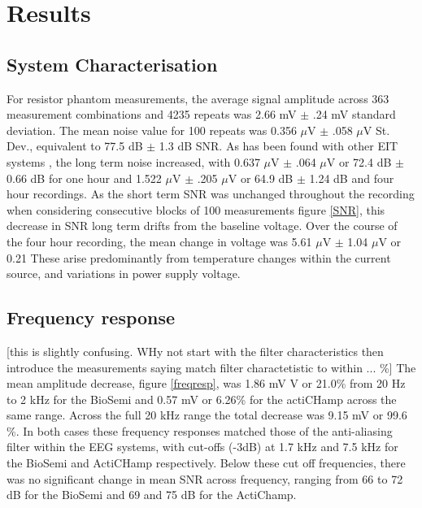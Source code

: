 \section{Results}
\subsection{System Characterisation}
For resistor phantom measurements, the average signal amplitude across 363 measurement combinations and 4235 repeats was 2.66 mV $\pm$ .24 mV standard deviation. The mean noise value for 100 repeats was 0.356 $\mu$V $\pm$ .058 $\mu$V St. Dev., equivalent to 77.5 dB $\pm$ 1.3 dB SNR. As has been found with other EIT systems \cite{oh2007multi}, the long term noise increased, with 0.637 $\mu$V $\pm$ .064 $\mu$V or 72.4 dB $\pm$ 0.66 dB for one hour and 1.522 $\mu$V $\pm$ .205 $\mu$V or 64.9 dB $\pm$ 1.24 dB and four hour recordings. As the short term SNR was unchanged throughout the recording when considering consecutive blocks of 100 measurements figure \ref{SNR}, this decrease in SNR 
long term drifts from the baseline voltage. Over the course of the four hour recording, the mean change in voltage was 5.61 $\mu$V $\pm$ 1.04 $\mu$V or 0.21 %
These arise predominantly from temperature changes within the current source, and variations in power supply voltage.

\subsection{Frequency response}
[this is slightly confusing. WHy not start with the filter characteristics then introduce the measurements saying match filter charactetistic to within ... \%] The mean amplitude decrease, figure \ref{freqresp}, was 1.86 mV V or 21.0\%  from 20 Hz to 2 kHz for the BioSemi and 0.57 mV or 6.26\% for the actiCHamp across the same range. Across the full 20 kHz range the total decrease was 9.15 mV or  99.6 \%.  In both cases these frequency responses matched those of the anti-aliasing filter within the EEG systems, with cut-offs (-3dB) at 1.7 kHz and 7.5 kHz for the BioSemi and ActiCHamp respectively. Below these cut off frequencies, there was no significant change in mean SNR across frequency, ranging from 66 to 72 dB for the BioSemi and 69 and 75 dB for the ActiChamp.  
